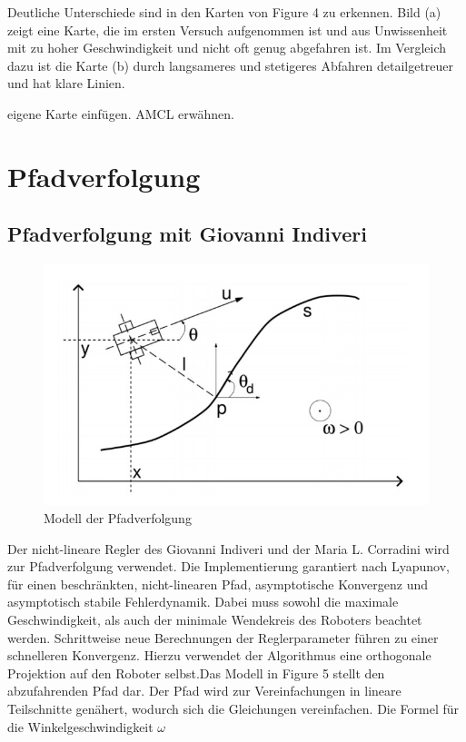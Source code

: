 \documentclass[11pt,a4paper]{article}
\begin{document}
{Deutliche Unterschiede sind in den Karten von Figure 4 zu erkennen. Bild (a) zeigt eine Karte, die im ersten Versuch aufgenommen ist und aus Unwissenheit mit zu hoher Geschwindigkeit und nicht oft genug abgefahren ist. Im Vergleich dazu ist die Karte (b) durch langsameres und stetigeres Abfahren detailgetreuer und hat klare Linien.


eigene Karte einfügen. AMCL erwähnen.


\section{Pfadverfolgung}
\subsection{Pfadverfolgung mit Giovanni Indiveri}
\cite{Giovanni}


\begin{figure}[h]
	\includegraphics[width=\linewidth]{pictures/Pfadverfolgung.JPG}
	\caption{Modell der Pfadverfolgung}
\end{figure}

Der nicht-lineare Regler des Giovanni Indiveri und der Maria L. Corradini wird zur Pfadverfolgung verwendet. Die Implementierung garantiert nach Lyapunov, f\"ur einen beschr\"ankten, nicht-linearen Pfad, asymptotische Konvergenz und asymptotisch stabile Fehlerdynamik. Dabei muss sowohl die maximale Geschwindigkeit, als auch der minimale Wendekreis des Roboters beachtet werden. Schrittweise neue Berechnungen der Reglerparameter f\"uhren zu einer schnelleren Konvergenz. Hierzu verwendet der Algorithmus eine orthogonale Projektion auf den Roboter selbst.Das Modell in Figure 5 stellt den abzufahrenden Pfad dar. Der Pfad wird zur Vereinfachungen in lineare Teilschnitte gen\"ahert, wodurch sich die Gleichungen vereinfachen. Die Formel f\"ur die Winkelgeschwindigkeit $\omega$


}
\end{document}
